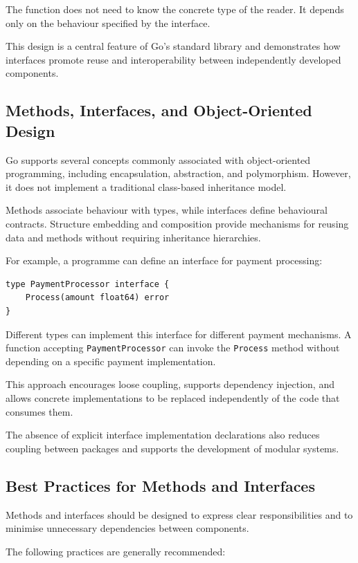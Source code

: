 The function does not need to know the concrete type of the reader. It depends only on the behaviour specified by the interface.

This design is a central feature of Go's standard library and demonstrates how interfaces promote reuse and interoperability between independently developed components.

\subsection{Methods, Interfaces, and Object-Oriented Design}

Go supports several concepts commonly associated with object-oriented programming, including encapsulation, abstraction, and polymorphism. However, it does not implement a traditional class-based inheritance model.

Methods associate behaviour with types, while interfaces define behavioural contracts. Structure embedding and composition provide mechanisms for reusing data and methods without requiring inheritance hierarchies.

For example, a programme can define an interface for payment processing:

\begin{lstlisting}
type PaymentProcessor interface {
    Process(amount float64) error
}
\end{lstlisting}

Different types can implement this interface for different payment mechanisms. A function accepting \texttt{PaymentProcessor} can invoke the \texttt{Process} method without depending on a specific payment implementation.

This approach encourages loose coupling, supports dependency injection, and allows concrete implementations to be replaced independently of the code that consumes them.

The absence of explicit interface implementation declarations also reduces coupling between packages and supports the development of modular systems.

\subsection{Best Practices for Methods and Interfaces}

Methods and interfaces should be designed to express clear responsibilities and to minimise unnecessary dependencies between components.

The following practices are generally recommended:

